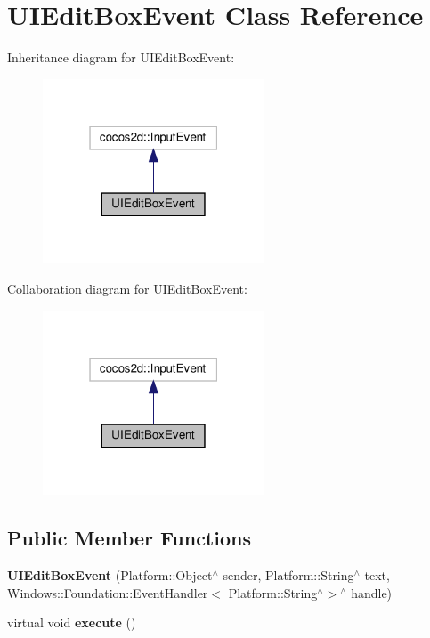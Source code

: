 \hypertarget{classUIEditBoxEvent}{}\section{U\+I\+Edit\+Box\+Event Class Reference}
\label{classUIEditBoxEvent}


Inheritance diagram for U\+I\+Edit\+Box\+Event\+:
\nopagebreak
\begin{figure}[H]
\begin{center}
\leavevmode
\includegraphics[width=187pt]{classUIEditBoxEvent__inherit__graph}
\end{center}
\end{figure}


Collaboration diagram for U\+I\+Edit\+Box\+Event\+:
\nopagebreak
\begin{figure}[H]
\begin{center}
\leavevmode
\includegraphics[width=187pt]{classUIEditBoxEvent__coll__graph}
\end{center}
\end{figure}
\subsection*{Public Member Functions}
\begin{DoxyCompactItemize}
\item 
\mbox{\label{classUIEditBoxEvent_a0c271cf2c51f749882683a36562578ac}} 
{\bfseries U\+I\+Edit\+Box\+Event} (Platform\+::\+Object$^\wedge$ sender, Platform\+::\+String$^\wedge$ text, Windows\+::\+Foundation\+::\+Event\+Handler$<$ Platform\+::\+String$^\wedge$$>$$^\wedge$ handle)
\item 
\mbox{\label{classUIEditBoxEvent_acfed2e98abc090120808e3f593f6fbb6}} 
virtual void {\bfseries execute} ()
\end{DoxyCompactItemize}


